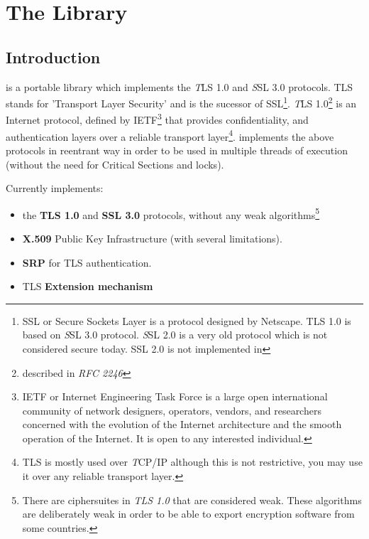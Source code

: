 \documentclass{book}
\begin{document}




\tableofcontents
\newpage
{}
\pagestyle{fancy}

\chapter{The Library}
\section{Introduction}
\par
\gnutls is a portable library which implements the {\emph TLS 1.0} and 
{\emph SSL 3.0} protocols.
TLS stands for 'Transport Layer Security' and is the sucessor of SSL\footnote{
SSL or Secure Sockets Layer is a protocol designed by Netscape. TLS 1.0 is based on
{\emph SSL 3.0} protocol. {\emph SSL 2.0} is a very old protocol which is 
not considered secure today. SSL 2.0 is not implemented in \gnutls}.
{\emph TLS 1.0}\footnote{described in {\it RFC 2246}} is an Internet protocol,
defined by IETF\footnote{IETF or Internet Engineering Task Force 
is a large open international community of network
designers, operators, vendors, and researchers concerned with the evolution of 
the Internet architecture and the smooth operation of the Internet. It is open to any interested individual.}
that provides confidentiality, and authentication layers over a {reliable
transport layer}\footnote{TLS is mostly used over {\emph TCP/IP} although this is not restrictive, you may
use it over any reliable transport layer.}. \gnutls implements the
above protocols in reentrant way in order to be used in multiple threads of 
execution (without the need for Critical Sections and locks).

\par
Currently \gnutls implements:
\begin{itemize}
 \item the {\bf TLS 1.0} and {\bf{ SSL 3.0}} protocols, without any weak algorithms\footnote{
There are ciphersuites in {\it TLS 1.0} that are considered weak. These algorithms are deliberately weak 
in order to be able to export encryption software from some countries.}
 \item {\bf X.509} Public Key Infrastructure (with several limitations).
 \item {\bf SRP} for TLS authentication.
 \item TLS {\bf Extension mechanism}
\end{itemize}
\end{document}
